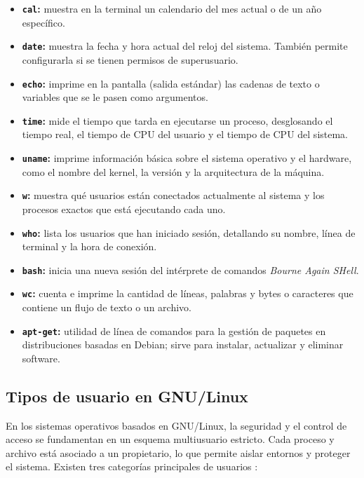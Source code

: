 \begin{itemize}[leftmargin=*]
    \item \textbf{\texttt{cal}:} muestra en la terminal un calendario del mes actual o de un año específico.
    \item \textbf{\texttt{date}:} muestra la fecha y hora actual del reloj del sistema. También permite configurarla si se tienen permisos de superusuario.
    \item \textbf{\texttt{echo}:} imprime en la pantalla (salida estándar) las cadenas de texto o variables que se le pasen como argumentos.
    \item \textbf{\texttt{time}:} mide el tiempo que tarda en ejecutarse un proceso, desglosando el tiempo real, el tiempo de CPU del usuario y el tiempo de CPU del sistema.
    \item \textbf{\texttt{uname}:} imprime información básica sobre el sistema operativo y el hardware, como el nombre del kernel, la versión y la arquitectura de la máquina.
    \item \textbf{\texttt{w}:} muestra qué usuarios están conectados actualmente al sistema y los procesos exactos que está ejecutando cada uno.
    \item \textbf{\texttt{who}:} lista los usuarios que han iniciado sesión, detallando su nombre, línea de terminal y la hora de conexión.
    \item \textbf{\texttt{bash}:} inicia una nueva sesión del intérprete de comandos \textit{Bourne Again SHell}.
    \item \textbf{\texttt{wc}:} cuenta e imprime la cantidad de líneas, palabras y bytes o caracteres que contiene un flujo de texto o un archivo.
    \item \textbf{\texttt{apt-get}:} utilidad de línea de comandos para la gestión de paquetes en distribuciones basadas en Debian; sirve para instalar, actualizar y eliminar software.
\end{itemize}


\subsection{Tipos de usuario en GNU/Linux}
En los sistemas operativos basados en GNU/Linux, la seguridad y el control de acceso se fundamentan en un esquema multiusuario estricto. Cada proceso y archivo está asociado a un propietario, lo que permite aislar entornos y proteger el sistema. Existen tres categorías principales de usuarios \cite{nemeth:unix-linux-admin:2017}:

